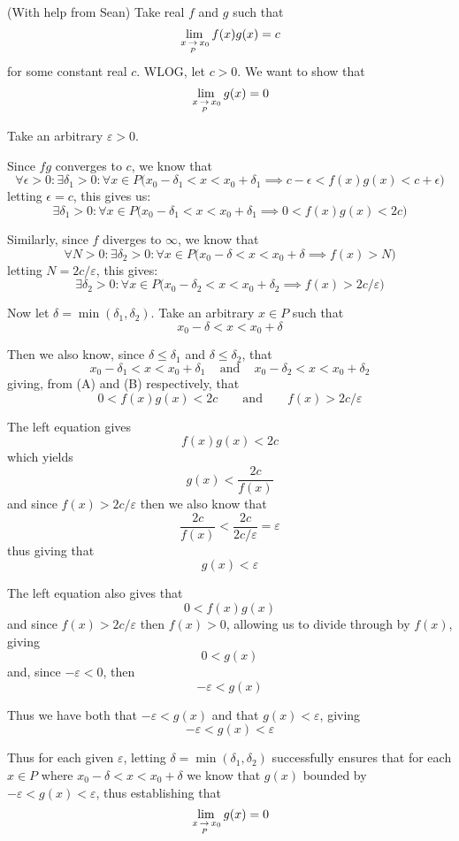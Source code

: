 \documentclass{article}
\theoremstyle{mytheoremstyle}
\renewenvironment{proof}[1][\proofname]{\noindent{\bfseries #1. }}{\begin{flushright}\smiley\end{flushright}}
\begin{document}
\begin{proof} (With help from Sean)
Take real $f$ and $g$ such that
$$ \limx{P}{x}{x_0} f(x) g(x) = c $$
for some constant real $c$. WLOG, let $c > 0$. We want to show that
$$ \limx{P}{x}{x_0} g(x) = 0 $$

Take an arbitrary $\varepsilon > 0$.

Since $fg$ converges to $c$, we know that
$$ \forall \epsilon > 0 : \exists \delta_1 > 0 : \forall x \in P \bigg( x_0 - \delta_1 < x < x_0 + \delta_1 \implies c - \epsilon < f(x)g(x) < c + \epsilon \bigg) $$
letting $\epsilon = c$, this gives us:
\[ \exists \delta_1 > 0: \forall x \in P \bigg( x_0 - \delta_1 < x < x_0 + \delta_1 \implies 0 < f(x)g(x) < 2c \bigg) \tag{A} \]

Similarly, since $f$ diverges to $\infty$, we know that
$$ \forall N > 0 : \exists \delta_2 > 0 : \forall x \in P \bigg( x_0 - \delta < x < x_0 + \delta \implies f(x) > N \bigg) $$
letting $N = 2c/\varepsilon$, this gives:
\[ \exists \delta_2 > 0 : \forall x \in P \bigg( x_0 - \delta_2 < x < x_0 + \delta_2 \implies f(x) > 2c/\varepsilon \bigg) \tag{B} \]

Now let $\delta = \min(\delta_1, \delta_2)$. Take an arbitrary $x \in P$ such that
$$x_0 - \delta < x < x_0 + \delta$$

Then we also know, since $\delta \leq \delta_1$ and $\delta \leq \delta_2$, that
$$x_0 - \delta_1 < x < x_0 + \delta_1 \hspace{10pt} \text{ and } \hspace{10pt} x_0 - \delta_2 < x < x_0 + \delta_2$$
giving, from (A) and (B) respectively, that
$$ 0 < f(x)g(x) < 2c \hspace{20pt} \text{ and } \hspace{20pt} f(x) > 2c/\varepsilon $$

The left equation gives
$$ f(x)g(x) < 2c $$
which yields
$$ g(x) < \frac{2c}{f(x)} $$
and since $f(x) > 2c/\varepsilon$ then we also know that
$$ \frac{2c}{f(x)} < \frac{2c}{2c/\varepsilon} = \varepsilon $$
thus giving that
$$ g(x) < \varepsilon $$

The left equation also gives that
$$ 0 < f(x)g(x) $$
and since $f(x) > 2c/\varepsilon$ then $f(x) > 0$, allowing us to divide through by $f(x)$, giving
$$ 0 < g(x) $$
and, since $-\varepsilon < 0$, then
$$ -\varepsilon < g(x) $$

Thus we have both that $-\varepsilon < g(x)$ and that $g(x) < \varepsilon$, giving
$$ -\varepsilon < g(x) < \varepsilon $$

Thus for each given $\varepsilon$, letting $\delta = \min(\delta_1, \delta_2)$ successfully ensures that for each $x \in P$ where $x_0-\delta < x < x_0+\delta$ we know that $g(x)$ bounded by $-\varepsilon < g(x) < \varepsilon$, thus establishing that
$$ \limx{P}{x}{x_0} g(x) = 0 $$

\end{proof}
\end{document}
